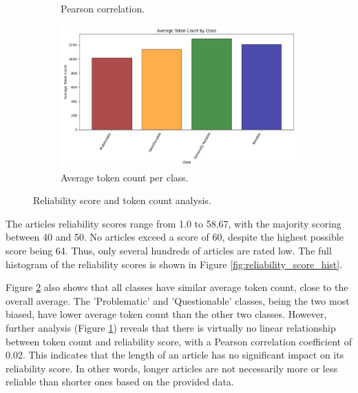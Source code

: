 \begin{figure}[htbp]
\begin{subfigure}{0.49\linewidth}
        \caption{Pearson correlation.}
        \label{fig:pearson}
    \end{subfigure}
    \begin{subfigure}{0.56\linewidth}
        \centering
        \includegraphics[width=1\linewidth]{figures/token_count_vx_per_class_hist.png}
        \caption{Average token count per class.}
        \label{fig:avg_token_per_class}
    \end{subfigure}
    \caption{Reliability score and token count analysis.}
    \label{fig:reliability_token_analysis}
\end{figure}

The articles reliability scores range from 1.0 to 58.67, with the majority scoring between 40 and 50. No articles  exceed a score of 60, despite the highest possible score being 64. Thus, only several hundreds of articles are rated low. The full histogram of the reliability scores is shown in Figure \ref{fig:reliability_score_hist}.

Figure \ref{fig:avg_token_per_class} also shows that all classes have similar average token count, close to the overall average. The 'Problematic' and 'Questionable' classes, being the two most biased, have lower average token count than the other two classes. However, further analysis (Figure \ref{fig:pearson}) reveals that there is virtually no linear relationship between token count and reliability score, with a Pearson correlation coefficient of 0.02. This indicates that the length of an article has no significant impact on its reliability score. In other words, longer articles are not necessarily more or less reliable than shorter ones based on the provided data.


